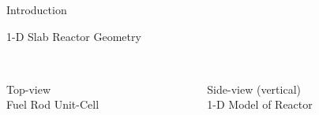 \documentclass{beamer}
\begin{document}
\begin{section}{Introduction}
\begin{frame}{1-D Slab Reactor Geometry}
\begin{columns}
\begin{column}{0.5\textwidth}
\begin{center}
    \\ Top-view
    \\ Fuel Rod Unit-Cell
  \end{center}
  \end{column}
  \begin{column}{0.5\textwidth}
  \begin{center}
    \scalebox{0.45}{}
      \\ Side-view (vertical)
      \\ 1-D Model of Reactor
  \end{center}
  \end{column}
\end{columns}
\end{frame}
\end{section}
\end{document}
